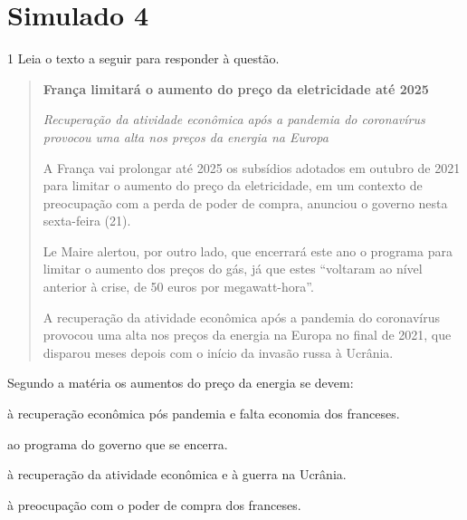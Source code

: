 \pagebreak

\section*{Simulado 4}

\num{1} Leia o texto a seguir para responder à questão. 

\begin{quote}

\textbf{França limitará o aumento do preço da eletricidade até 2025}

\textit{Recuperação da atividade econômica após a pandemia do coronavírus
provocou uma alta nos preços da energia na Europa}

A França vai prolongar até 2025 os subsídios adotados em outubro de 2021
para limitar o aumento do preço da eletricidade, em um contexto de
preocupação com a perda de poder de compra, anunciou o governo nesta
sexta-feira (21).

Le Maire alertou, por outro lado, que encerrará este ano o programa para
limitar o aumento dos preços do gás, já que estes ``voltaram ao nível
anterior à crise, de 50 euros por megawatt-hora''.

A recuperação da atividade econômica após a pandemia do coronavírus
provocou uma alta nos preços da energia na Europa no final de 2021, que
disparou meses depois com o início da invasão russa à Ucrânia.

\end{quote}


Segundo a matéria os aumentos do preço da energia se devem:

\begin{escolha}
    
    \item à recuperação econômica pós pandemia e falta economia dos franceses.
    
    \item ao programa do governo que se encerra.
    
    \item à recuperação da atividade econômica e à guerra na Ucrânia.
    
    \item à preocupação com o poder de compra dos franceses.

\end{escolha}

